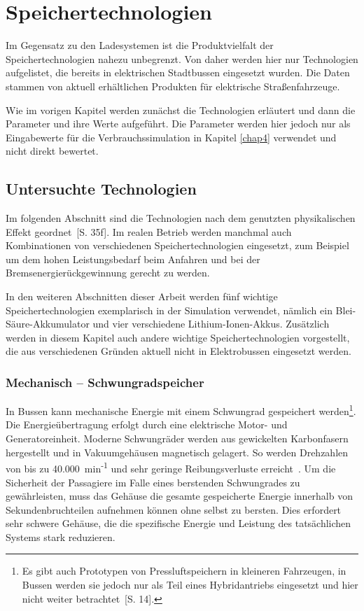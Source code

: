 \chapter{Speichertechnologien}
Im Gegensatz zu den Ladesystemen ist die Produktvielfalt der Speichertechnologien nahezu unbegrenzt. Von daher werden hier nur Technologien aufgelistet, die bereits in elektrischen Stadtbussen eingesetzt wurden. Die Daten stammen von aktuell erhältlichen Produkten für elektrische Straßenfahrzeuge.

Wie im vorigen Kapitel werden zunächst die Technologien erläutert und dann die Parameter und ihre Werte aufgeführt. Die Parameter werden hier jedoch nur als Eingabewerte für die Verbrauchssimulation in Kapitel \ref{chap4} verwendet und nicht direkt bewertet.

\section{Untersuchte Technologien}
Im folgenden Abschnitt sind die Technologien nach dem genutzten physikalischen Effekt geordnet~\cite{Sterner:2014}[S. 35f]. Im realen Betrieb werden manchmal auch Kombinationen von verschiedenen Speichertechnologien eingesetzt, zum Beispiel um dem hohen Leistungsbedarf beim Anfahren und bei der Bremsenergierückgewinnung gerecht zu werden.

In den weiteren Abschnitten dieser Arbeit werden fünf wichtige Speichertechnologien exemplarisch in der Simulation verwendet, nämlich ein Blei-Säure-Akkumulator und vier verschiedene Lithium-Ionen-Akkus. Zusätzlich werden in diesem Kapitel auch andere wichtige Speichertechnologien vorgestellt, die aus verschiedenen Gründen aktuell nicht in Elektrobussen eingesetzt werden.

\subsection{Mechanisch – Schwungradspeicher}
In Bussen kann mechanische Energie mit einem Schwungrad gespeichert werden\footnote{Es gibt auch Prototypen von Pressluftspeichern in kleineren Fahrzeugen, in Bussen werden sie jedoch nur als Teil eines Hybridantriebs eingesetzt und hier nicht weiter betrachtet~\cite{Sebastian-Naumann:2014}[S. 14].}. Die Energieübertragung erfolgt durch eine elektrische Motor- und Generatoreinheit. Moderne Schwungräder werden aus gewickelten Karbonfasern hergestellt und in Vakuumgehäusen magnetisch gelagert. So werden Drehzahlen von bis zu 40.000~min\textsuperscript{-1} und sehr geringe Reibungsverluste erreicht~\cite{993788}. Um die Sicherheit der Passagiere im Falle eines berstenden Schwungrades zu gewährleisten, muss das Gehäuse die gesamte gespeicherte Energie innerhalb von Sekundenbruchteilen aufnehmen können ohne selbst zu bersten. Dies erfordert sehr schwere Gehäuse, die die spezifische Energie und Leistung des tatsächlichen Systems stark reduzieren.

